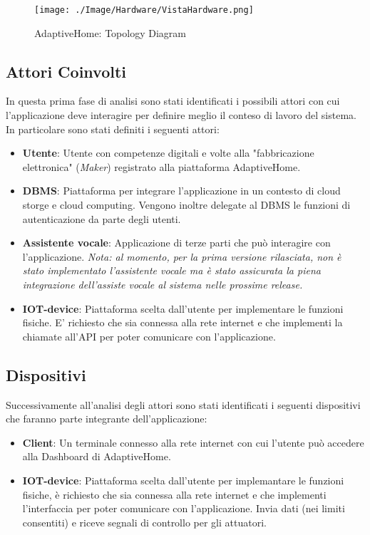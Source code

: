\documentclass[onecolumn,a4paper]{article}
\begin{document}
\begin{figure}[htbp]
\centering
\texttt{[image: ./Image/Hardware/VistaHardware.png]}
\caption{\label{fig:org591d0d5}AdaptiveHome: Topology Diagram}
\end{figure}

\subsection{Attori Coinvolti}
\label{sec:orgee16f14}
In questa prima fase di analisi sono stati identificati i possibili attori con cui l'applicazione deve interagire per definire meglio il conteso di lavoro del sistema. In particolare sono stati definiti i seguenti attori:

\begin{itemize}
\item \textbf{Utente}: Utente con competenze digitali e volte alla "fabbricazione elettronica" (\emph{Maker}) registrato alla piattaforma AdaptiveHome.
\item \textbf{DBMS}: Piattaforma per integrare l'applicazione in un contesto di cloud storge e cloud computing. Vengono inoltre delegate al DBMS le funzioni di autenticazione da parte degli utenti.
\item \textbf{Assistente vocale}: Applicazione di terze parti che può interagire con l'applicazione. \emph{Nota: al momento, per la prima versione rilasciata, non è stato implementato l'assistente vocale ma è stato assicurata la piena integrazione dell'assiste vocale al sistema nelle prossime release.}
\item \textbf{IOT-device}: Piattaforma scelta dall'utente per implementare le funzioni fisiche. E' richiesto che sia connessa alla rete internet e che implementi la chiamate all'API per poter comunicare con l'applicazione.
\end{itemize}

\subsection{Dispositivi}
\label{sec:org069a46d}
Successivamente all'analisi degli attori sono stati identificati i seguenti dispositivi che faranno parte integrante dell'applicazione: 
\begin{itemize}
\item \textbf{Client}: Un terminale connesso alla rete internet con cui l'utente può accedere alla Dashboard di AdaptiveHome.
\item \textbf{IOT-device}: Piattaforma scelta dall'utente per implemantare le funzioni fisiche, è richiesto che sia connessa alla rete internet e che implementi l'interfaccia per poter comunicare con l'applicazione. Invia dati (nei limiti consentiti) e riceve segnali di controllo per gli attuatori.
\end{itemize}
\end{document}
